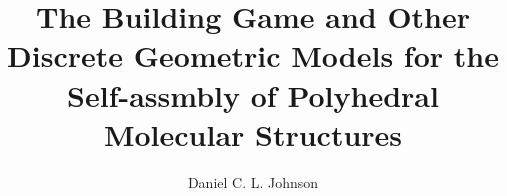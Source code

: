 \documentclass[12pt,twoside]{report}  %
\title{
The Building Game and Other Discrete Geometric Models for the Self-assmbly of Polyhedral Molecular Structures 
}
\author{Daniel C. L. Johnson}
\begin{document}
\doublespacing
\begin{preliminaries}
\maketitle

\copyrightpage

\begin{signature}
\end{signature}

\begin{vita}
  
\end{vita}

\begin{acknowledgments}
  
\end{acknowledgments}

\begin{abstract}
  
  \thispagestyle{empty}
\end{abstract}

\begin{spacing}{1}
  \tableofcontents
  \clearpage{\pagestyle{empty}\cleardoublepage}

  \footnotesize
  \fontsize{11.5pt}{12.5pt}\selectfont
  \listoftables
  \clearpage{\pagestyle{empty}\cleardoublepage}

  \listoffigures
  \clearpage{\pagestyle{empty}\cleardoublepage}
  \normalsize
\end{spacing}

\end{preliminaries}

\pagestyle{myheadings}

\newtheorem{mythm}{Theorem}
\newtheorem{mylem}{Lemma}
\newtheorem{mycor}{Corollary}
\newtheorem{mydef}{Definition}

\newcommand{\colorA}{white}
\newcommand{\colorB}{black}
\newcommand{\colorAsm}{w}
\newcommand{\colorBsm}{b}
\newcommand{\poly}{$\mathscr{P}$}
\newcommand{\Poly}{\mathscr{P}}
\newcommand{\PolyGraph}{\textswab{G}_\mathscr{P}}
\newcommand{\faceset}{F\left(\mathscr{P}\right)}
\newcommand{\spc}{ }
\newcommand{\xj}{$x^j$}
\newcommand{\xk}{$x^k$}
\newcommand{\Sjk}{$S_{jk}$}
\newcommand{\Skj}{$S_{kj}$}
\newcommand{\G}{G_\mathscr{P}}
\end{document}
